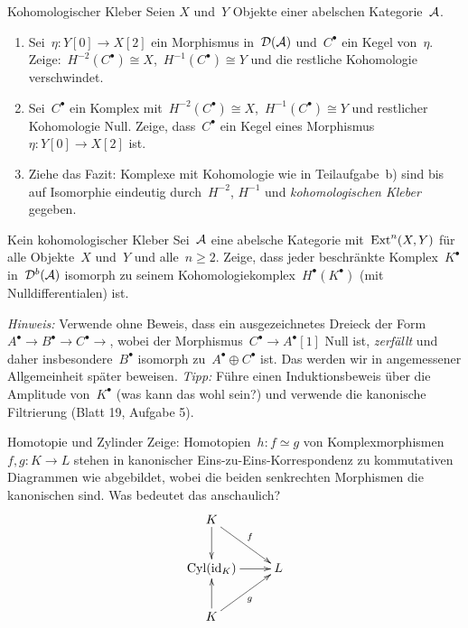 \documentclass{uebblatt}
\begin{document}
\begin{aufgabe}{Kohomologischer Kleber}
Seien $X$ und~$Y$ Objekte einer abelschen Kategorie~$\mathcal{A}$.
\begin{enumerate}
\item Sei~$\eta : Y[0] \to X[2]$ ein Morphismus in~$\mathcal{D}(\mathcal{A})$ und~$C^\bullet$ ein Kegel
von~$\eta$. \\ Zeige:~$H^{-2}(C^\bullet) \cong X$,~$H^{-1}(C^\bullet)
\cong Y$ und die restliche Kohomologie verschwindet.
\item Sei~$C^\bullet$ ein Komplex mit~$H^{-2}(C^\bullet) \cong
X$,~$H^{-1}(C^\bullet) \cong Y$ und restlicher Kohomologie Null. Zeige, dass~$C^\bullet$
ein Kegel eines Morphismus~$\eta : Y[0] \to X[2]$ ist.
\item Ziehe das Fazit: Komplexe mit Kohomologie wie in Teilaufgabe~b) sind
bis auf Isomorphie eindeutig durch~$H^{-2}$, $H^{-1}$ und \emph{kohomologischen
Kleber} gegeben.
\end{enumerate}
\end{aufgabe}

\begin{aufgabe}{Kein kohomologischer Kleber}
Sei~$\mathcal{A}$ eine abelsche Kategorie mit~$\mathrm{Ext}^n(X,Y)$ für alle Objekte~$X$ und~$Y$
und alle~$n \geq 2$. Zeige, dass jeder beschränkte Komplex~$K^\bullet$
in~$\mathcal{D}^b(\mathcal{A})$ isomorph zu seinem Kohomologiekomplex~$H^\bullet(K^\bullet)$ (mit
Nulldifferentialen) ist.

{\scriptsize \emph{Hinweis:} Verwende ohne Beweis, dass ein ausgezeichnetes
Dreieck der Form~$A^\bullet \to B^\bullet \to C^\bullet \to$, wobei der
Morphismus~$C^\bullet \to A^\bullet[1]$ Null ist, \emph{zerfällt} und daher
insbesondere~$B^\bullet$ isomorph zu~$A^\bullet \oplus C^\bullet$ ist. Das
werden wir in angemessener Allgemeinheit später beweisen.
\emph{Tipp:}
Führe einen Induktionsbeweis über die Amplitude von~$K^\bullet$
(was kann das wohl sein?) und verwende die kanonische Filtrierung (Blatt 19,
Aufgabe 5).\par}
\end{aufgabe}

\begin{aufgabe}{Homotopie und Zylinder}
Zeige: Homotopien~$h : f \simeq g$ von Komplexmorphismen~$f, g : K \to L$
stehen in kanonischer Eins-zu-Eins-Korrespondenz zu kommutativen Diagrammen wie
abgebildet, wobei die beiden senkrechten Morphismen die kanonischen sind. Was
bedeutet das anschaulich?
\[ \xymatrix{
  K \ar[rd]^f \ar[d] \\
  \operatorname{Cyl}(\id_K) \ar[r] & L \\
  K \ar[ru]_g \ar[u]
} \]
\end{aufgabe}
\end{document}
